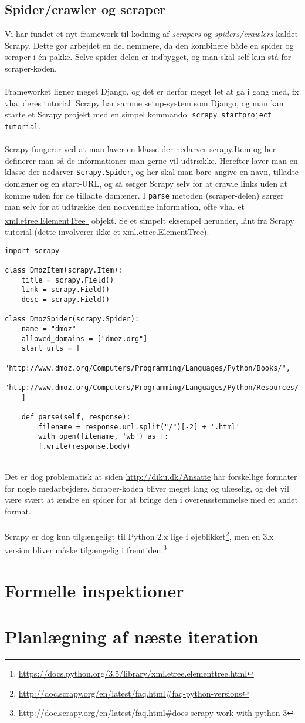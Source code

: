 \documentclass[11pt]{article}
\begin{document}
\subsection{Spider/crawler og scraper}
Vi har fundet et nyt framework til kodning af \textit{scrapers} og \textit{spiders/crawlers} kaldet Scrapy. Dette gør arbejdet en del nemmere, da den kombinere både en spider og scraper i én pakke. Selve spider-delen er indbygget, og man skal self kun stå for scraper-koden.\\
\\
Frameworket ligner meget Django, og det er derfor meget let at gå i gang med, fx vha. deres tutorial. Scrapy har samme setup-system som Django, og man kan starte et Scrapy projekt med en simpel kommando: \texttt{scrapy startproject tutorial}.\\
\\
Scrapy fungerer ved at man laver en klasse der nedarver scrapy.Item og her definerer man så de informationer man gerne vil udtrække. Herefter laver man en klasse der nedarver \texttt{Scrapy.Spider}, og her skal man bare angive en navn, tilladte domæner og en start-URL, og så sørger Scrapy selv for at crawle links uden at komme uden for de tilladte domæner. I \texttt{parse} metoden (scraper-delen) sørger man selv for at udtrække den nødvendige information, ofte vha. et \href{https://docs.python.org/3.5/library/xml.etree.elementtree.html}{xml.etree.ElementTree}\footnote{\url{https://docs.python.org/3.5/library/xml.etree.elementtree.html}} objekt. Se et simpelt eksempel herunder, lånt fra Scrapy tutorial (dette involverer ikke et xml.etree.ElementTree).\\
\begin{lstlisting}
import scrapy

class DmozItem(scrapy.Item):
    title = scrapy.Field()
    link = scrapy.Field()
    desc = scrapy.Field()

class DmozSpider(scrapy.Spider):
    name = "dmoz"
    allowed_domains = ["dmoz.org"]
    start_urls = [
        "http://www.dmoz.org/Computers/Programming/Languages/Python/Books/",
        "http://www.dmoz.org/Computers/Programming/Languages/Python/Resources/"
    ]

    def parse(self, response):
        filename = response.url.split("/")[-2] + '.html'
        with open(filename, 'wb') as f:
        f.write(response.body)
\end{lstlisting}
~\\
Det er dog problematisk at siden \url{http://diku.dk/Ansatte} har forskellige formater for nogle medarbejdere. Scraper-koden bliver meget lang og ulæselig, og det vil være svært at ændre en spider for at bringe den i overensstemmelse med et andet format.\\
\\
Scrapy er dog kun tilgængeligt til Python 2.x lige i øjeblikket\footnote{\url{http://doc.scrapy.org/en/latest/faq.html\#faq-python-versions}}, men en 3.x version bliver måske tilgængelig i fremtiden.\footnote{\url{http://doc.scrapy.org/en/latest/faq.html\#does-scrapy-work-with-python-3}}\\

\section{Formelle inspektioner}

\section{Planlægning af næste iteration}
\end{document}
